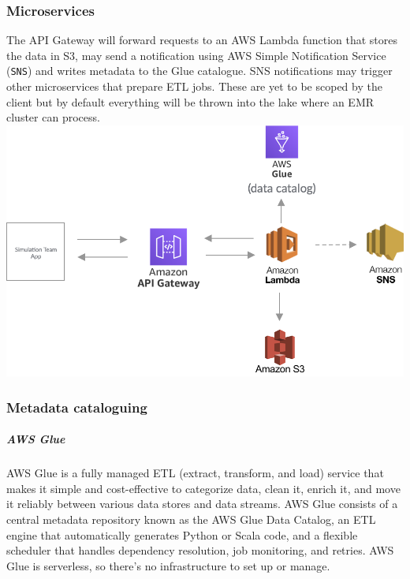 \documentclass[10pt]{article}
\begin{document}
\subsubsection{Microservices}
\begin{minipage}{\textwidth}
The API Gateway will forward requests to an AWS Lambda function that stores the data in S3, may send a notification using AWS Simple Notification Service (\texttt{SNS}) and writes metadata to the Glue catalogue. SNS notifications may trigger other microservices that prepare ETL jobs. These are yet to be scoped by the client but by default everything will be thrown into the lake where an EMR cluster can process.\\

\includegraphics[width=0.8\linewidth]{images/Lambda.png}

\end{minipage}


\subsubsection{Metadata cataloguing}
\subparagraph{AWS Glue}
AWS Glue \cite{aws-glue} is a fully managed ETL (extract, transform, and load) service that makes it simple and cost-effective to categorize data, clean it, enrich it, and move it reliably between various data stores and data streams. AWS Glue consists of a central metadata repository known as the AWS Glue Data Catalog, an ETL engine that automatically generates Python or Scala code, and a flexible scheduler that handles dependency resolution, job monitoring, and retries. AWS Glue is serverless, so there’s no infrastructure to set up or manage.
\end{document}
